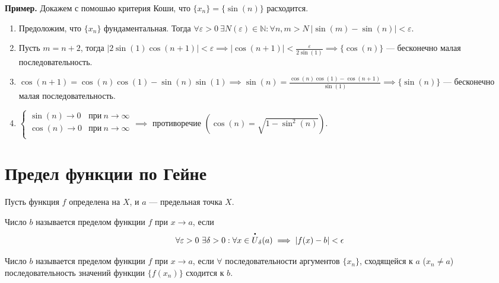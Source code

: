 \documentclass{article}
\begin{document}
\noindent \textbf{Пример.} Докажем с помошью критерия Коши, что \(\{x_n\} = \{\sin(n)\}\) расходится.
\begin{enumerate}
    \item Предоложим, что \(\{x_n\}\) фундаментальная. Тогда \(\forall \varepsilon > 0\ \exists N(\varepsilon) \in \mathbb{N}: \forall n, m > N\ \left\vert \sin(m) - \sin(n) \right\vert < \varepsilon\).
    \item Пусть \(m = n + 2\), тогда \(\displaystyle \left\vert 2\sin(1)\cos(n + 1) \right\vert < \varepsilon \implies \left\vert \cos(n + 1) \right\vert < \frac{\varepsilon}{2\sin(1)} \implies \{\cos(n)\}\) --- бесконечно малая последовательность.
    \item \(\displaystyle \cos(n + 1) = \cos(n)\cos(1) - \sin(n)\sin(1) \implies \sin(n) = \frac{\cos(n)\cos(1) - \cos(n + 1)}{\sin(1)} \implies \{\sin(n)\}\) --- бесконечно малая последовательность.
    \item 
    \(\begin{cases}
        \sin(n) \to 0 & \text{при}\ n \to \infty\\
        \cos(n) \to 0 & \text{при}\ n \to \infty\\
    \end{cases} \implies \) противоречие \(\left(\cos(n) = \sqrt{1 - \sin^2(n)}\right)\).  
\end{enumerate}

\section{Предел функции по Гейне}
Пусть функция \(f\) определена на \(X\), и \(a\) --- предельная точка \(X\).

\begin{definition}
    \noindent Число \(b\) называется пределом функции \(f\) при \(x \to a\), если
    \[
        \forall \varepsilon > 0\ \exists \delta > 0: \forall x \in \overset{\dt}{U}_{\delta}(a) \implies \left\vert f(x) - b \right\vert < \epsilon
    \]   
\end{definition}

\begin{definition}
    \noindent Число \(b\) называется пределом функции \(f\) при \(x \to a\), если \(\forall\) последовательности аргументов \(\{x_n\}\), сходящейся к \(a\) (\(x_n \neq a\)) последовательность значений функции \(\{f(x_n)\}\) сходится к \(b\).    
\end{definition}
\end{document}
